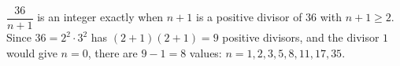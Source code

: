 $\dfrac{36}{n+1}$ is an integer exactly when $n+1$ is a positive divisor of $36$ with $n+1\ge2$. Since $36=2^2\cdot3^2$ has $(2+1)(2+1)=9$ positive divisors, and the divisor $1$ would give $n=0$, there are $9-1=\boxed{8}$ values: $n=1,2,3,5,8,11,17,35$.
